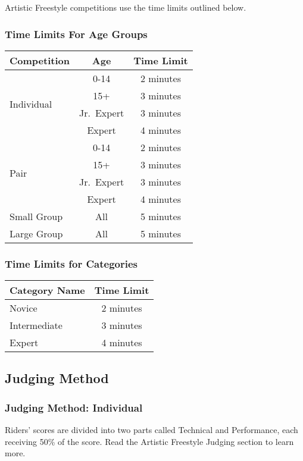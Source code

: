 Artistic Freestyle competitions use the time limits outlined below.

\subsubsection{Time Limits For Age Groups}

\begin{tabular}{|l|c|c|}
\hline
\textbf{Competition} & \textbf{Age} & \textbf{Time Limit} \\
\hline
\multirow{4}{*}{Individual} & 0-14 & 2 minutes \\
\cline{2-3}
& 15+ & 3 minutes \\ 
\cline{2-3}
& Jr.~Expert & 3 minutes \\ 
\cline{2-3}
& Expert & 4 minutes \\
\hline
\multirow{4}{*}{Pair} & 0-14 & 2 minutes \\
\cline{2-3}
& 15+ & 3 minutes \\
\cline{2-3}
& Jr.~Expert & 3 minutes \\
\cline{2-3}
& Expert & 4 minutes \\
\hline
Small Group & All & 5 minutes \\
\hline
Large Group & All & 5 minutes \\
\hline
\end{tabular}

\subsubsection{Time Limits for Categories}
\begin{tabular}{|l|c|}
\hline
\textbf{Category Name} & \textbf{Time Limit} \\
\hline
Novice & 2 minutes \\
\hline
Intermediate & 3 minutes \\
\hline
Expert & 4 minutes \\
\hline
\end{tabular}
 

\subsection{Judging Method}

\subsubsection{Judging Method: Individual}
Riders' scores are divided into two parts called Technical and Performance, each receiving 50\% of the score.
Read the Artistic Freestyle Judging section to learn more.

